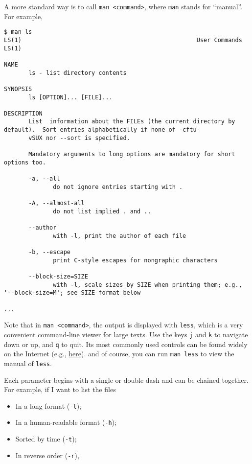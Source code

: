 \documentclass[12pt,letterpaper]{article}
\begin{document}
A more standard way is to call \texttt{man <command>}, where \texttt{man} stands for ``manual''. For example,

\begin{verbatim}
$ man ls
LS(1)                                                  User Commands                                                  LS(1)

NAME
       ls - list directory contents

SYNOPSIS
       ls [OPTION]... [FILE]...

DESCRIPTION
       List  information about the FILEs (the current directory by default).  Sort entries alphabetically if none of -cftu‐
       vSUX nor --sort is specified.

       Mandatory arguments to long options are mandatory for short options too.

       -a, --all
              do not ignore entries starting with .

       -A, --almost-all
              do not list implied . and ..

       --author
              with -l, print the author of each file

       -b, --escape
              print C-style escapes for nongraphic characters

       --block-size=SIZE
              with -l, scale sizes by SIZE when printing them; e.g., '--block-size=M'; see SIZE format below

...
\end{verbatim}

Note that in \texttt{man <command>}, the output is displayed with \texttt{less}, which is a very convenient command-line viewer for large texts. Use the keys \texttt{j} and \texttt{k} to navigate down or up, and \texttt{q} to quit. Its most commonly used controls can be found widely on the Internet (e.g., \href{https://linuxize.com/post/less-command-in-linux/#less-commands}{here}). and of course, you can run \texttt{man less} to view the manual of \texttt{less}.

Each parameter begins with a single or double dash and can be chained together. For example, if I want to list the files

\begin{itemize}
   \item In a long format (\texttt{-l});
   \item In a human-readable format (\texttt{-h});
   \item Sorted by time (\texttt{-t});
   \item In reverse order (\texttt{-r}),
\end{itemize}
\end{document}
